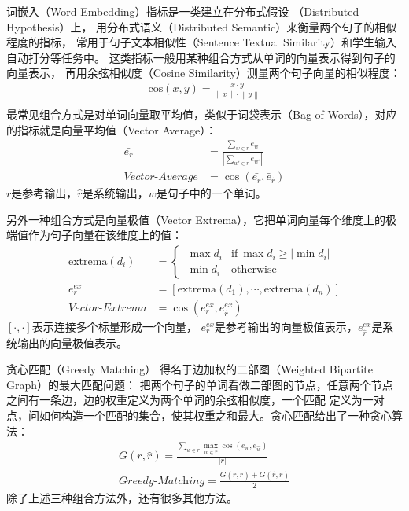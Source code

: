 词嵌入（Word Embedding）指标是一类建立在分布式假设
（Distributed Hypothesis）上，
用分布式语义（Distributed Semantic）来衡量两个句子的相似程度的指标，
常用于句子文本相似性（Sentence Textual Similarity）和学生输入自动打分等任务中。
这类指标一般用某种组合方式从单词的向量表示得到句子的向量表示，
再用余弦相似度（Cosine Similarity）测量两个句子向量的相似程度：
\begin{align}
    \text{cos}(x, y) = \frac{x\cdot y}
    {\left\| x \right\| \cdot \left\| y \right\|} \\
\end{align}
最常见组合方式是对单词向量取平均值，类似于词袋表示（Bag-of-Words），对应的指标就是向量平均值（Vector Average）：
\begin{align}
    \bar{e_r} &= \frac{\sum_{w \in r} e_w}{|\sum_{w' \in r} e_{w'}|} \\
    \textit{Vector-Average} &= \cos(\bar{e_r}, \bar{e}_{\hat{r}})
\end{align}
$r$是参考输出，$\hat{r}$是系统输出，$w$是句子中的一个单词。

另外一种组合方式是向量极值（Vector Extrema），它把单词向量每个维度上的极端值作为句子向量在该维度上的值：
\begin{align}
    \text{extrema}(d_i) &=
    \begin{cases}
        \ \max d_i & \text{if}\ \max d_i \geq |\min d_i| \\
        \ \min d_i & \text{otherwise}
    \end{cases} \\
    e_r^{ex} &= [\text{extrema}(d_1), \cdots, \text{extrema}(d_n)] \\
    \textit{Vector-Extrema} &= \cos( e_r^{ex}, e_{\hat{r}}^{ex} )
\end{align}
$[\cdot, \cdot]$表示连接多个标量形成一个向量，
$e_r^{ex}$是参考输出的向量极值表示，$e_{\hat{r}}^{ex}$是系统输出的向量极值表示。

贪心匹配（Greedy Matching）
得名于边加权的二部图（Weighted Bipartite Graph）的最大匹配问题：
把两个句子的单词看做二部图的节点，任意两个节点之间有一条边，边的权重定义为两个单词的余弦相似度，一个匹配
定义为一对点，问如何构造一个匹配的集合，使其权重之和最大。贪心匹配给出了一种贪心算法：
\begin{align}
    G(r, \hat{r}) = \frac{
    \sum_{w \in r} \max_{\hat{w} \in \hat{r}} \cos(e_w, e_{\hat{w}})
    }{ |r| } \\
    \textit{Greedy-Matching} = \frac{
    G(r, \hat{r}) + G(\hat{r}, r)
    }{2}
\end{align}
除了上述三种组合方法外，还有很多其他方法。

